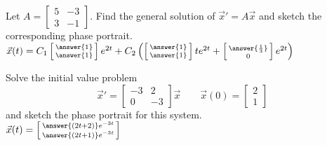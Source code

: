 \documentclass{ximera}
\begin{document}
\begin{exercise}
    Let
    $A = \left[ 
        \begin{smallmatrix} 
            5 & -3 \\ 
            3 & -1 
        \end{smallmatrix} 
    \right]$.
    Find the general solution of ${\vec{x}}' = A \vec{x}$ and sketch the corresponding phase portrait.\\
    $\vec{x}(t) = C_1 \left[\begin{smallmatrix}  \answer{1} \\ \answer{1} \end{smallmatrix}\right]e^{2t} + C_2\left( \left[\begin{smallmatrix} \answer{1} \\ \answer{1} \end{smallmatrix}\right]te^{2t} + \left[\begin{smallmatrix} \answer{\frac{1}{3}} \\ 0 \end{smallmatrix}\right]e^{2t}\right)$
\end{exercise}

\begin{exercise}
    Solve the initial value problem
    \[ 
        {\vec{x}}' = 
        \begin{bmatrix} 
            -3 & 2 \\ 
            0 & -3 
        \end{bmatrix} 
        \vec{x} \qquad \vec{x}(0) = 
        \begin{bmatrix} 
            2 \\ 
            1 
        \end{bmatrix} 
    \] 
    and sketch the phase portrait for this system.\\
    $\vec{x}(t) = \left[\begin{smallmatrix} \answer{(2t+2)}e^{-3t} \\ \answer{(2t+1)}e^{-3t} \end{smallmatrix}\right]$
\end{exercise}
\end{document}
